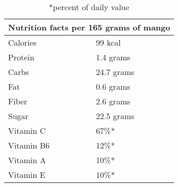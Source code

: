 \begin{table}[htbp]
\begin{tabular}{|lllll|}
\hline
\multicolumn{5}{|l|}{Nutrition facts per 165 grams of mango} \\ \hline
\multicolumn{4}{|l|}{Calories}           & 99 kcal           \\ \hline
\multicolumn{4}{|l|}{Protein}            & 1.4 grams         \\ \hline
\multicolumn{4}{|l|}{Carbs}              & 24.7 grams        \\ \hline
\multicolumn{4}{|l|}{Fat}                & 0.6 grams         \\ \hline
\multicolumn{4}{|l|}{Fiber}              & 2.6 grams         \\ \hline
\multicolumn{4}{|l|}{Sugar}              & 22.5 grams        \\ \hline
\multicolumn{4}{|l|}{Vitamin C}          & 67\%*             \\ \hline
\multicolumn{4}{|l|}{Vitamin B6}         & 12\%*             \\ \hline
\multicolumn{4}{|l|}{Vitamin A}          & 10\%*             \\ \hline
\multicolumn{4}{|l|}{Vitamin E}          & 10\%*             \\ \hline
\end{tabular}
\label{mngtab}
\caption{*percent of daily value}
\end{table}